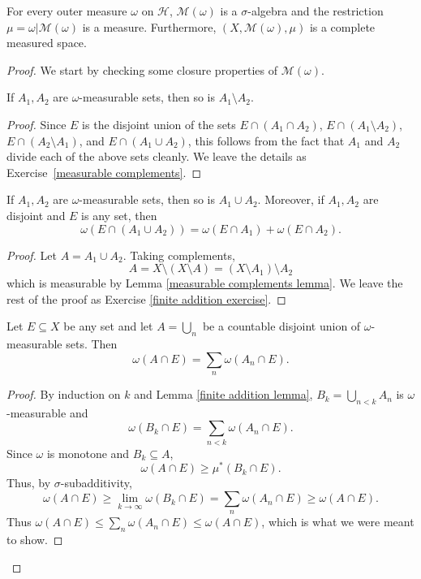 \begin{theorem}[Carathéodory]
For every outer measure $\omega$ on $\mathcal H$, $\mathcal M(\omega)$ is a $\sigma$-algebra and the restriction $\mu = \omega|\mathcal M(\omega)$ is a measure.
Furthermore, $(X, \mathcal M(\omega), \mu)$ is a complete measured space.
\end{theorem}
\begin{proof}
We start by checking some closure properties of $\mathcal M(\omega)$.

\begin{lemma}\label{measurable complements lemma}
If $A_{1}, A_{2}$ are $\omega$-measurable sets, then so is $A_{1} \setminus A_{2}$.
\end{lemma}
\begin{proof}
Since $E$ is the disjoint union of the sets $E \cap (A_{1} \cap A_{2})$, $E \cap (A_{1} \setminus A_{2})$, $E \cap (A_{2} \setminus A_{1})$, and $E \cap (A_{1} \cup A_{2})$, this follows from the fact that $A_{1}$ and $A_{2}$ divide each of the above sets cleanly.
We leave the details as Exercise~\ref{measurable complements}.
\end{proof}

\begin{lemma}\label{finite addition lemma}
If $A_{1}, A_{2}$ are $\omega$-measurable sets, then so is $A_{1} \cup A_{2}$.
Moreover, if $A_{1}, A_{2}$ are disjoint and $E$ is any set, then
$$\omega(E \cap (A_{1} \cup A_{2})) = \omega(E \cap A_{1}) + \omega(E \cap A_{2}).$$
\end{lemma}
\begin{proof}
Let $A = A_{1} \cup A_{2}$. Taking complements,
$$A = X \setminus (X \setminus A) = (X \setminus A_{1}) \setminus A_{2}$$
which is measurable by Lemma \ref{measurable complements lemma}.
We leave the rest of the proof as Exercise \ref{finite addition exercise}.
\end{proof}

\begin{lemma}
\label{countable additivity lemma}
Let $E \subseteq X$ be any set and let $A = \bigcup_{n}$ be a countable disjoint union of $\omega$-measurable sets. Then
$$\omega(A \cap E) = \sum_n \omega(A_{n} \cap E).$$
\end{lemma}
\begin{proof}
By induction on $k$ and Lemma \ref{finite addition lemma}, $B_{k} = \bigcup_{n < k} A_{n}$ is $\omega$-measurable and
$$\omega(B_{k} \cap E) = \sum_{n<k} \omega(A_{n} \cap E).$$
Since $\omega$ is monotone and $B_{k} \subseteq A$,
$$\omega(A \cap E) \geq \mu^{*}(B_{k} \cap E).$$
Thus, by $\sigma$-subadditivity,
$$\omega(A \cap E) \geq \lim_{k \to \infty} \omega(B_{k} \cap E) = \sum_n \omega(A_{n} \cap E) \geq \omega(A \cap E).$$
Thus $\omega(A \cap E) \leq \sum_n \omega(A_{n} \cap E) \leq \omega(A \cap E)$, which is what we were meant to show.
\end{proof}


\end{proof}

